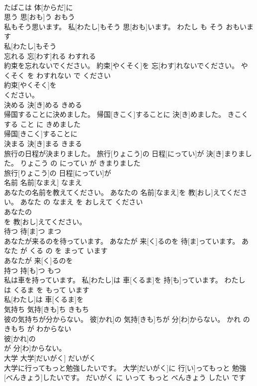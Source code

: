 \documentclass[8pt]{extreport}
\begin{document}
\begin{CJK}{UTF8}{min}
\\	たばこは 体[からだ]に
\\	思う	思[おも]う	おもう	
\\	私もそう思います。	私[わたし]もそう 思[おも]います。	わたし も そう おもいます	
\\	私[わたし]もそう
\\	忘れる	忘[わす]れる	わすれる	
\\	約束を忘れないでください。	約束[やくそく]を 忘[わす]れないでください。	やくそく を わすれない で ください	
\\	約束[やくそく]を
\\	ください。			
\\	決める	決[き]める	きめる	
\\	帰国することに決めました。	帰国[きこく]することに 決[き]めました。	きこく する こと に きめました	
\\	帰国[きこく]することに
\\	決まる	決[き]まる	きまる	
\\	旅行の日程が決まりました。	旅行[りょこう]の 日程[にってい]が 決[き]まりました。	りょこう の にってい が きまりました	
\\	旅行[りょこう]の 日程[にってい]が
\\	名前	名前[なまえ]	なまえ	
\\	あなたの名前を教えてください。	あなたの 名前[なまえ]を 教[おし]えてください。	あなた の なまえ を おしえて ください	
\\	あなたの
\\	を 教[おし]えてください。			
\\	待つ	待[ま]つ	まつ	
\\	あなたが来るのを待っています。	あなたが 来[く]るのを 待[ま]っています。	あなた が くる の を まって います	
\\	あなたが 来[く]るのを
\\	持つ	持[も]つ	もつ	
\\	私は車を持っています。	私[わたし]は 車[くるま]を 持[も]っています。	わたし は くるま を もって います	
\\	私[わたし]は 車[くるま]を
\\	気持ち	気持[きも]ち	きもち	
\\	彼の気持ちが分からない。	彼[かれ]の 気持[きも]ちが 分[わ]からない。	かれ の きもち が わからない	
\\	彼[かれ]の
\\	が 分[わ]からない。			
\\	大学	大学[だいがく]	だいがく	
\\	大学に行ってもっと勉強したいです。	大学[だいがく]に 行[い]ってもっと 勉強[べんきょう]したいです。	だいがく に いって もっと べんきょう したい です	

\end{CJK}
\end{document}
